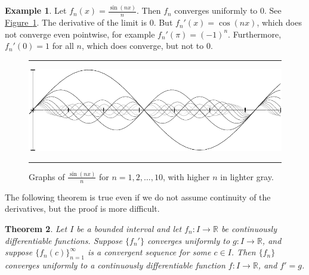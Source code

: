 \documentclass[12pt,openany]{book}
\newcommand{\R}{{\mathbb{R}}}
\theoremstyle{plain}
\newtheorem{thm}{Theorem}[section]
\theoremstyle{remark}
\theoremstyle{definition}
\newenvironment{myfig}{%
\begin{figure}[h!t]
\noindent\rule{\textwidth}{0.4pt}\vspace{12pt}\par\centering}%
{\par\noindent\rule{\textwidth}{0.4pt}
\end{figure}}
\theoremstyle{exercise}
\theoremstyle{example}
\newtheorem{example}[thm]{Example}
\newcommand{\figureref}[1]{\hyperref[#1]{Figure~\ref*{#1}}}
\begin{document}
\begin{example}
Let $f_n(x) = \frac{\sin(nx)}{n}$.  Then $f_n$ converges uniformly to
0.  See \figureref{fig:conv1nsinxn}.
The derivative of the limit is 0.  But $f_n'(x) = \cos(nx)$, which
does not converge even pointwise, for
example $f_n'(\pi) = {(-1)}^n$.  Furthermore,
$f_n'(0) = 1$ for all $n$, which does converge, but not to 0.
\begin{myfig}
\includegraphics{figures/conv1nsinxn}
\caption{Graphs of $\frac{\sin(nx)}{n}$ for
$n=1,2,\ldots,10$, with higher $n$ in lighter gray.%
\label{fig:conv1nsinxn}}
\end{myfig}
\end{example}

The following theorem is true even if 
we do not assume continuity of the derivatives, but the proof is more
difficult.

\begin{thm} \label{thm:dersconverge}
Let $I$ be a bounded interval and let
$f_n \colon I \to \R$ be continuously differentiable functions.
Suppose $\{ f_n' \}$ converges uniformly to $g \colon I \to \R$,
and suppose $\{ f_n(c) \}_{n=1}^\infty$ is a
convergent sequence for some $c \in I$.  Then $\{ f_n \}$ converges uniformly to 
a continuously differentiable function $f \colon I \to \R$, and $f' = g$.
\end{thm}
\end{document}
